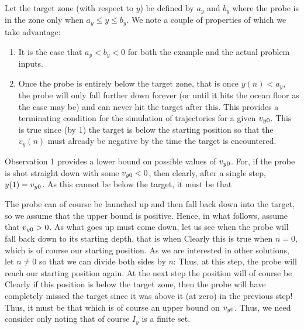 \documentclass{article}
\begin{document}
{    Let the target zone (with respect to $y$) be defined by $a_y$ and $b_y$ where the probe is in the zone only when $a_y \leq y \leq b_y$.
    We note a couple of properties of which we take advantage:
    \begin{enumerate}
        \item It is the case that $a_y < b_y < 0$ for both the example and the actual problem inputs.
        \item Once the probe is entirely below the target zone, that is once $y(n) < a_y$, the probe will only fall further down forever (or until it hits the ocean floor as the case may be) and can never hit the target after this.
        This provides a terminating condition for the simulation of trajectories for a given $v_{y0}$.
        This is true since (by 1) the target is below the starting position so that the $v_y(n)$ must already be negative by the time the target is encountered.
    \end{enumerate}
    Observation 1 provides a lower bound on possible values of $v_{y0}$.
    For, if the probe is shot straight down with some $v_{y0} < 0$, then clearly, after a single step, $y(1) = v_{y0}$.
    As this cannot be below the target, it must be that
    
    The probe can of course be launched up and then fall back down into the target, so we assume that the upper bound is positive.
    Hence, in what follows, assume that $v_{y0} > 0$.
    As what goes up must come down, let us see when the probe will fall back down to its starting depth, that is when
    Clearly this is true when $n = 0$, which is of course our starting position.
    As we are interested in other solutions, let $n \neq 0$ so that we can divide both sides by $n$:
    Thus, at this step, the probe will reach our starting position again.
    At the next step the position will of course be
    Clearly if this position is below the target zone, then the probe will have completely missed the target since it was above it (at zero) in the previous step!
    Thus, it must be that
    which is of course an upper bound on $v_{y0}$.
    Thus, we need consider only
    noting that of course $I_y$ is a finite set.

}
\end{document}
